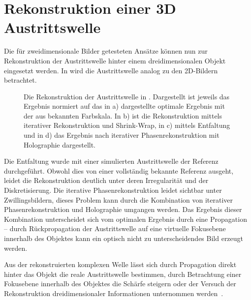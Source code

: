 \section{Rekonstruktion einer 3D Austrittswelle}
Die für zweidimensionale Bilder getesteten Ansätze können nun zur Rekonstruktion der Austrittswelle hinter einem dreidimensionalen Objekt eingesetzt werden. In  wird die Austrittswelle analog zu den 2D-Bildern betrachtet.

\begin{figure}
	\centering
	\caption[Rekonstruktion einer Austrittswelle]{Die Rekonstruktion der Austrittswelle in . Dargestellt ist jeweils das Ergebnis normiert auf das in a) dargestellte optimale Ergebnis mit der aus  bekannten Farbskala. In b) ist die Rekonstruktion mittels iterativer Rekonstruktion und Shrink-Wrap, in c) mittels Entfaltung und in d) das Ergebnis nach iterativer Phasenrekonstruktion mit Holographie dargestellt.}
	\label{fig:recon3d}
\end{figure}	
Die Entfaltung wurde mit einer simulierten Austrittswelle der Referenz durchgeführt. Obwohl dies von einer vollständig bekannte Referenz ausgeht, leidet die Rekonstruktion deutlich unter deren Irregularität und der Diskretisierung. Die iterative Phasenrekonstruktion leidet sichtbar unter Zwillingsbildern, dieses Problem kann durch die Kombination von iterativer Phasenrekonstruktion und Holographie umgangen werden. Das Ergebnis dieser Kombination unterscheidet sich vom optimalen Ergebnis durch eine Propagation -- durch Rückpropagation der Austrittswelle auf eine virtuelle Fokusebene innerhalb des Objektes kann ein optisch nicht zu unterscheidendes Bild erzeugt werden.

Aus der rekonstruierten komplexen Welle lässt sich durch Propagation direkt hinter das Objekt die reale Austrittswelle bestimmen, durch Betrachtung einer Fokusebene innerhalb des Objektes die Schärfe steigern oder der Versuch der Rekonstruktion dreidimensionaler Informationen unternommen werden~\cite{ulmer2015}. 
